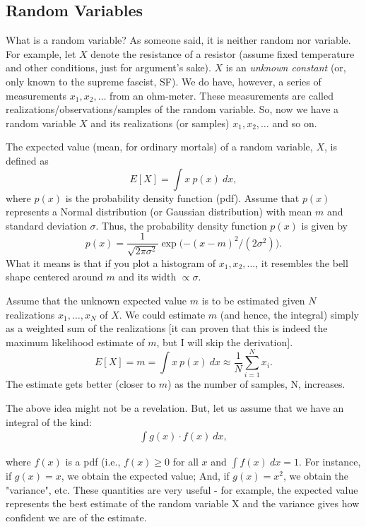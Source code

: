 \documentclass[11pt,onecolumn]{article}
\begin{document}
\subsection{Random Variables}
What is a random variable? As someone said, it is neither random nor variable. For example, let $X$ denote the resistance of a resistor (assume fixed temperature and other conditions, just for argument's sake). $X$ is an {\em unknown constant} (or, only known to the supreme fascist, SF). We do have, however, a series of measurements $x_1, x_2, \dots $ from an ohm-meter. These measurements are called realizations/observations/samples of the random variable. So, now we have a random variable $X$ and its realizations (or samples) $x_1, x_2, \dots $ and so on.

The expected value (mean, for ordinary mortals) of a random variable, $X$, is defined as
\[
E[X] = \int x~ p(x)~ dx,
\]
where $p(x)$ is the probability density function (pdf). Assume that $p(x)$ represents a Normal distribution (or Gaussian distribution) with mean $m$ and standard deviation $\sigma$. Thus, the probability density function $p(x)$ is given by
\[
 p(x) = \frac{1}{\sqrt{2\pi \sigma^2}} \exp\biggl({-(x-m)^2/(2\sigma^2)}\biggr).
\]
What it means is that if you plot a histogram of  $x_1, x_2, \dots $, it resembles the bell shape centered around  $m$ and its width $\propto \sigma$.

Assume that the unknown expected value $m$ is to be estimated given $N$ realizations $x_1,\dots,x_N$ of $X$. We could estimate $m$ (and hence, the integral) simply as a weighted sum of the realizations [it can proven that this is indeed the maximum likelihood estimate of $m$, but I will skip the derivation].
\[
E[X] = m =  \int x~ p(x)~ dx \approx \frac{1}{N} \sum_{i=1}^N x_i.
\] 
The estimate gets better (closer to $m$) as the number of samples, N, increases.

The above idea might not be a revelation. But, let us assume that we have an integral of the kind:
\begin{align}
\int  g(x) \cdot f(x)~ dx ,
\label{eq:gxfx}
\end{align}


where $f(x)$ is a pdf (i.e., $f(x) \ge 0$ for all $x$ and $\int f(x)~dx = 1$.
For instance, if $g(x) = x$, we obtain the expected value; And, if $g(x) = x^2$, we obtain the 
"variance", etc. These quantities are very useful - for example, the expected 
 value represents the best estimate of the random variable X and the variance 
 gives how confident we are of the estimate.
\end{document}
